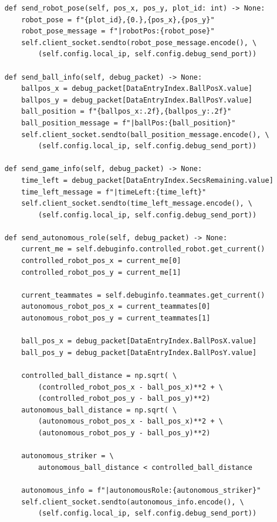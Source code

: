 \documentclass[a4paper, onecolumn, 12pt]{article}
\begin{document}
\begin{verbatim}
    def send_robot_pose(self, pos_x, pos_y, plot_id: int) -> None:
        robot_pose = f"{plot_id},{0.},{pos_x},{pos_y}"
        robot_pose_message = f"|robotPos:{robot_pose}"
        self.client_socket.sendto(robot_pose_message.encode(), \
            (self.config.local_ip, self.config.debug_send_port))
        
    def send_ball_info(self, debug_packet) -> None:
        ballpos_x = debug_packet[DataEntryIndex.BallPosX.value]
        ballpos_y = debug_packet[DataEntryIndex.BallPosY.value]
        ball_position = f"{ballpos_x:.2f},{ballpos_y:.2f}"
        ball_position_message = f"|ballPos:{ball_position}"
        self.client_socket.sendto(ball_position_message.encode(), \ 
            (self.config.local_ip, self.config.debug_send_port))
        
    def send_game_info(self, debug_packet) -> None:
        time_left = debug_packet[DataEntryIndex.SecsRemaining.value]
        time_left_message = f"|timeLeft:{time_left}"
        self.client_socket.sendto(time_left_message.encode(), \
            (self.config.local_ip, self.config.debug_send_port))

    def send_autonomous_role(self, debug_packet) -> None:
        current_me = self.debuginfo.controlled_robot.get_current()
        controlled_robot_pos_x = current_me[0]
        controlled_robot_pos_y = current_me[1]

        current_teammates = self.debuginfo.teammates.get_current()
        autonomous_robot_pos_x = current_teammates[0]
        autonomous_robot_pos_y = current_teammates[1]

        ball_pos_x = debug_packet[DataEntryIndex.BallPosX.value]
        ball_pos_y = debug_packet[DataEntryIndex.BallPosY.value]

        controlled_ball_distance = np.sqrt( \
            (controlled_robot_pos_x - ball_pos_x)**2 + \
            (controlled_robot_pos_y - ball_pos_y)**2)
        autonomous_ball_distance = np.sqrt( \
            (autonomous_robot_pos_x - ball_pos_x)**2 + \
            (autonomous_robot_pos_y - ball_pos_y)**2)

        autonomous_striker = \
            autonomous_ball_distance < controlled_ball_distance

        autonomous_info = f"|autonomousRole:{autonomous_striker}"
        self.client_socket.sendto(autonomous_info.encode(), \
            (self.config.local_ip, self.config.debug_send_port))
\end{verbatim}
\end{document}
